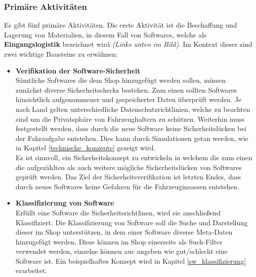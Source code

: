 \subsubsection{Primäre Aktivitäten}
Es gibt fünf primäre Aktivitäten. Die erste Aktivität ist die Beschaffung und Lagerung von Materialien, in diesem Fall von Softwares, welche als \textbf{Eingangslogistik} bezeichnet wird \textit{(Links unten im Bild)}. Im Kontext dieser sind zwei wichtige Bausteine zu erwähnen:
\begin{itemize}
	\item[] \hspace{-0.6cm}\textbf{Verifikation der Software-Sicherheit}\\ \label{security}
	Sämtliche Softwares die dem Shop hinzugefügt werden sollen, müssen zunächst diverse Sicherheitschecks bestehen. Zum einen sollten Softwares hinsichtlich aufgenommener und gespeicherter Daten überprüft werden. Je nach Land gelten unterschiedliche Datenschutzrichtlinien, welche zu beachten sind um die Privatsphäre von Fahrzeughaltern zu schützen. Weiterhin muss festgestellt werden, dass durch die neue Software keine Sicherheitslücken bei der Fahraufgabe entstehen. Dies kann durch Simulationen getan werden, wie in Kapitel \ref{technische_konzepte} gezeigt wird.\\
	Es ist sinnvoll, ein Sicherheitskonzept zu entwickeln in welchem die zum einen die aufgezählten als auch weitere mögliche Sicherheitslücken von Softwares geprüft werden. Das Ziel der Sicherheitsverifikation ist letzten Endes, dass durch neues Softwares keine Gefahren für die Fahrzeuginsassen entstehen. 
	
	\item[] \hspace{-0.6cm} \textbf{Klassifizierung von Software}\\
	Erfüllt eine Software die Sicherheitsrichtlinen, wird sie anschließend Klassifiziert. Die Klassifizierung von Software soll die Suche und Darstellung dieser im Shop unterstützen, in dem einer Software diverse Meta-Daten hinzugefügt werden. Diese können im Shop einerseits als Such-Filter verwendet werden, einzelne können auc angeben wie gut/schlecht eine Software ist. Ein beispielhaftes Konzept  wird in Kapitel \ref{sw_klassifizierung} erarbeitet.
\end{itemize}
